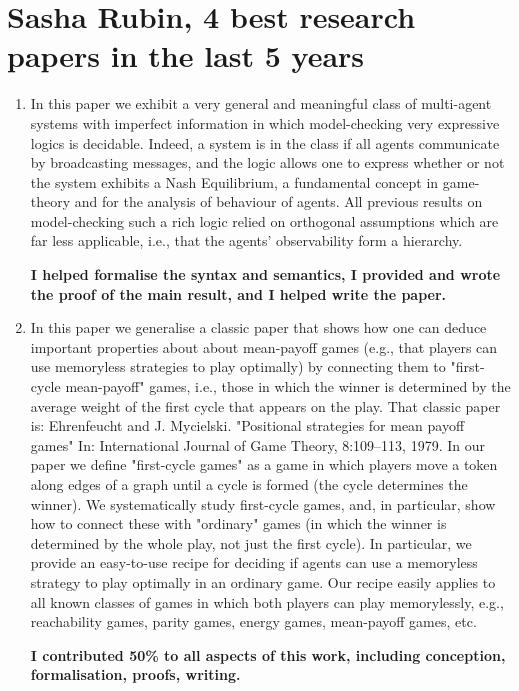 \documentclass[a4paper,10pt]{scrartcl}
\begin{document}
\section*{Sasha Rubin, 4 best research papers in the last 5 years}

\begin{enumerate} 
\item {} In this paper we exhibit a very general and meaningful class of multi-agent systems with imperfect information in which model-checking very expressive logics is 
decidable. Indeed, a system is in the class if all agents communicate by broadcasting  messages, and the logic allows one to express whether or not the system exhibits a Nash Equilibrium, a fundamental concept in game-theory and for the analysis of behaviour of agents. All previous results on model-checking such a rich logic relied on orthogonal assumptions which are far less applicable, i.e., that the agents' observability form a hierarchy. 

\textbf{I helped formalise the syntax and semantics,  I provided and wrote the proof of the main result, and I helped write the paper.}

\item {} In this paper we generalise a classic paper that shows how one can deduce important properties about about mean-payoff games (e.g.,
that players can use memoryless strategies to play optimally) by connecting them to "first-cycle mean-payoff" games, i.e., those in which the winner is determined by the average weight of the first cycle that appears on the play. That classic paper is: Ehrenfeucht and J. Mycielski. "Positional strategies for mean payoff games" In: International Journal of Game Theory, 8:109--113, 1979. 
In our paper we define "first-cycle games" as a game in which players move a token along edges of a graph until a cycle is formed 
(the cycle determines the winner). We systematically study first-cycle games, and, in particular, show how to connect these with "ordinary" games (in which the winner is determined by the whole play, not just the first cycle). In particular, we provide an easy-to-use recipe for deciding if agents can use a memoryless strategy to play optimally in an ordinary game. Our recipe easily applies to all known classes of games in which both players can play memorylessly, e.g., reachability games, parity games, energy games, mean-payoff games, etc. 

\textbf{I contributed 50\% to all aspects of this work, including conception, formalisation, proofs, writing.}


\end{enumerate}
\end{document}
